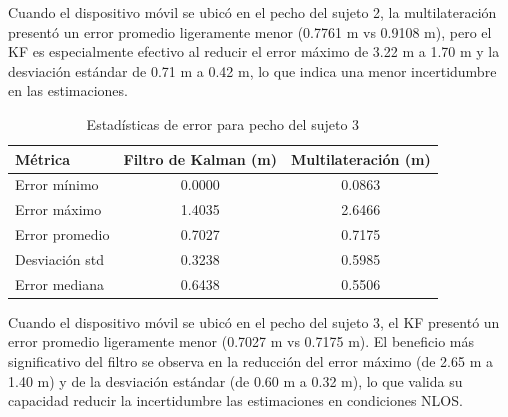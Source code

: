 %
Cuando el dispositivo móvil se ubicó en el pecho del sujeto 2, la multilateración presentó un error promedio ligeramente menor (0.7761 m vs 0.9108 m), pero el KF es especialmente efectivo al reducir el error máximo de 3.22 m a 1.70 m y la desviación estándar de 0.71 m a 0.42 m, lo que indica una menor incertidumbre en las estimaciones.
%
\begin{table}[t]
\centering
\caption{Estadísticas de error para pecho del sujeto 3}
\label{tab:estadisticas_pecho_s3}
\begin{tabular}{lcc}
\hline
\rowcolor{headerblue}
\textbf{Métrica} & \textbf{Filtro de Kalman (m)} & \textbf{Multilateración (m)} \\
\hline
Error mínimo & 0.0000 & 0.0863 \\
Error máximo & 1.4035 & 2.6466 \\
Error promedio & 0.7027 & 0.7175 \\
Desviación std & 0.3238 & 0.5985 \\
Error mediana & 0.6438 & 0.5506 \\
\hline
\end{tabular}
\end{table}
%
Cuando el dispositivo móvil se ubicó en el pecho del sujeto 3, el KF presentó un error promedio ligeramente menor (0.7027 m vs 0.7175 m). El beneficio más significativo del filtro se observa en la reducción del error máximo (de 2.65 m a 1.40 m) y de la desviación estándar (de 0.60 m a 0.32 m), lo que valida su capacidad reducir la incertidumbre las estimaciones en condiciones NLOS.



